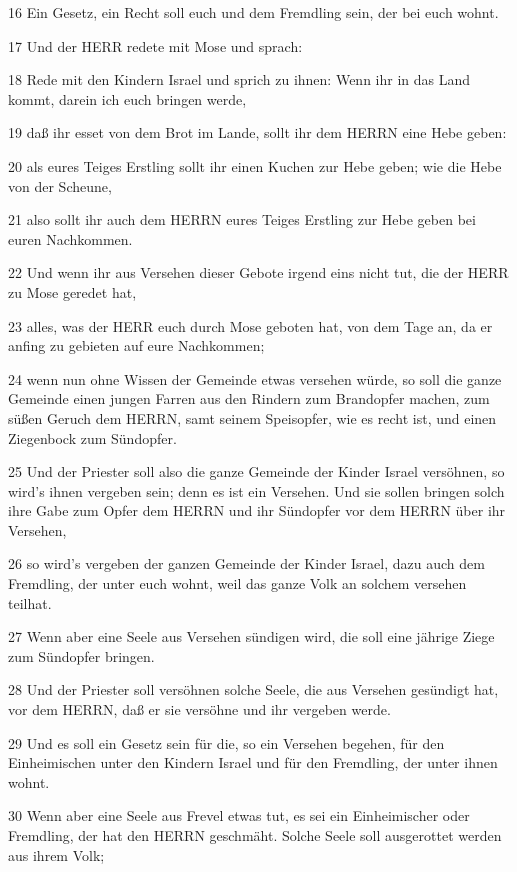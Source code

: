 \par 16 Ein Gesetz, ein Recht soll euch und dem Fremdling sein, der bei euch wohnt.
\par 17 Und der HERR redete mit Mose und sprach:
\par 18 Rede mit den Kindern Israel und sprich zu ihnen: Wenn ihr in das Land kommt, darein ich euch bringen werde,
\par 19 daß ihr esset von dem Brot im Lande, sollt ihr dem HERRN eine Hebe geben:
\par 20 als eures Teiges Erstling sollt ihr einen Kuchen zur Hebe geben; wie die Hebe von der Scheune,
\par 21 also sollt ihr auch dem HERRN eures Teiges Erstling zur Hebe geben bei euren Nachkommen.
\par 22 Und wenn ihr aus Versehen dieser Gebote irgend eins nicht tut, die der HERR zu Mose geredet hat,
\par 23 alles, was der HERR euch durch Mose geboten hat, von dem Tage an, da er anfing zu gebieten auf eure Nachkommen;
\par 24 wenn nun ohne Wissen der Gemeinde etwas versehen würde, so soll die ganze Gemeinde einen jungen Farren aus den Rindern zum Brandopfer machen, zum süßen Geruch dem HERRN, samt seinem Speisopfer, wie es recht ist, und einen Ziegenbock zum Sündopfer.
\par 25 Und der Priester soll also die ganze Gemeinde der Kinder Israel versöhnen, so wird's ihnen vergeben sein; denn es ist ein Versehen. Und sie sollen bringen solch ihre Gabe zum Opfer dem HERRN und ihr Sündopfer vor dem HERRN über ihr Versehen,
\par 26 so wird's vergeben der ganzen Gemeinde der Kinder Israel, dazu auch dem Fremdling, der unter euch wohnt, weil das ganze Volk an solchem versehen teilhat.
\par 27 Wenn aber eine Seele aus Versehen sündigen wird, die soll eine jährige Ziege zum Sündopfer bringen.
\par 28 Und der Priester soll versöhnen solche Seele, die aus Versehen gesündigt hat, vor dem HERRN, daß er sie versöhne und ihr vergeben werde.
\par 29 Und es soll ein Gesetz sein für die, so ein Versehen begehen, für den Einheimischen unter den Kindern Israel und für den Fremdling, der unter ihnen wohnt.
\par 30 Wenn aber eine Seele aus Frevel etwas tut, es sei ein Einheimischer oder Fremdling, der hat den HERRN geschmäht. Solche Seele soll ausgerottet werden aus ihrem Volk;
